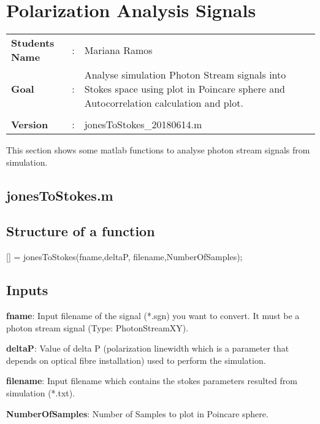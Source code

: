 \clearpage

\section{Polarization Analysis Signals}

\begin{tcolorbox}	
	\begin{tabular}{p{2.75cm} p{0.2cm} p{10.5cm}} 	
		\textbf{Students Name}  &:& Mariana Ramos\\
		\textbf{Goal}           &:& Analyse simulation Photon Stream signals into Stokes space using plot in Poincare sphere and Autocorrelation calculation and plot. \\\\
		\textbf{Version}        &:& jonesToStokes\_20180614.m 
	\end{tabular}
\end{tcolorbox}


This section shows some matlab functions to analyse photon stream signals from simulation.

\subsection{jonesToStokes.m}

\subsection*{Structure of a function}

[] = jonesToStokes(fname,deltaP, filename,NumberOfSamples);

\subsection*{Inputs}

\indent

\textbf{fname}: Input filename of the signal (*.sgn) you want to convert. It must be a photon stream signal (Type: PhotonStreamXY).
\bigskip

\textbf{deltaP}: Value of delta P (polarization linewidth which is a parameter that depends on optical fibre installation) used to perform the simulation.
\bigskip

\textbf{filename}: Input filename which contains the stokes parameters resulted from simulation (*.txt).
\bigskip

\textbf{NumberOfSamples}: Number of Samples to plot in Poincare sphere.


